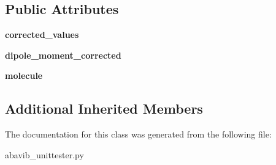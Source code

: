 \subsection*{Public Attributes}
\begin{DoxyCompactItemize}
\item 
\hypertarget{classabavib__unittester_1_1dipole__test_a2704463450130b37abb2a97a078feae0}{{\bfseries corrected\+\_\+values}}\label{classabavib__unittester_1_1dipole__test_a2704463450130b37abb2a97a078feae0}

\item 
\hypertarget{classabavib__unittester_1_1dipole__test_a331c16d1033ae7c8c7f8cb509571c6d9}{{\bfseries dipole\+\_\+moment\+\_\+corrected}}\label{classabavib__unittester_1_1dipole__test_a331c16d1033ae7c8c7f8cb509571c6d9}

\item 
\hypertarget{classabavib__unittester_1_1dipole__test_ac673e906d28924b83550f5a3641bb1f3}{{\bfseries molecule}}\label{classabavib__unittester_1_1dipole__test_ac673e906d28924b83550f5a3641bb1f3}

\end{DoxyCompactItemize}
\subsection*{Additional Inherited Members}


The documentation for this class was generated from the following file\+:\begin{DoxyCompactItemize}
\item 
abavib\+\_\+unittester.\+py\end{DoxyCompactItemize}
